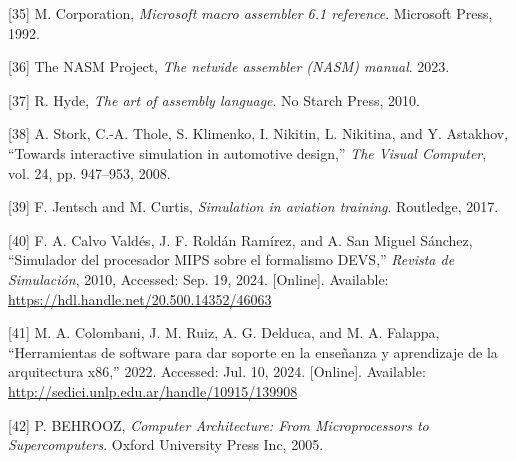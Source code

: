 \documentclass[12pt,oneside]{templates/unerthesis}
\newcommand{\CSLLeftMargin}[1]{#1} %
\newcommand{\CSLRightInline}[1]{#1} %
\newlength{\cslhangindent}
\newenvironment{CSLReferences}[2] %
 {\setlength{\parindent}{0pt}%
  \setlength{\leftskip}{#1 pt\relax}%
  \setlength{\parskip}{#2 pt\relax}%
  \everypar{\setlength{\hangindent}{\cslhangindent}}}
 {\par}
\begin{document}
\begin{CSLReferences}{0}{0}
\leavevmode{}%
\CSLLeftMargin{{[}35{]} }%
\CSLRightInline{M. Corporation, \emph{Microsoft macro assembler 6.1 reference}. Microsoft Press, 1992.}

\leavevmode{}%
\CSLLeftMargin{{[}36{]} }%
\CSLRightInline{The NASM Project, \emph{The netwide assembler (NASM) manual}. 2023.}

\leavevmode{}%
\CSLLeftMargin{{[}37{]} }%
\CSLRightInline{R. Hyde, \emph{The art of assembly language}. No Starch Press, 2010.}

\leavevmode{}%
\CSLLeftMargin{{[}38{]} }%
\CSLRightInline{A. Stork, C.-A. Thole, S. Klimenko, I. Nikitin, L. Nikitina, and Y. Astakhov, {``Towards interactive simulation in automotive design,''} \emph{The Visual Computer}, vol. 24, pp. 947--953, 2008.}

\leavevmode{}%
\CSLLeftMargin{{[}39{]} }%
\CSLRightInline{F. Jentsch and M. Curtis, \emph{Simulation in aviation training}. Routledge, 2017.}

\leavevmode{}%
\CSLLeftMargin{{[}40{]} }%
\CSLRightInline{F. A. Calvo Valdés, J. F. Roldán Ramírez, and A. San Miguel Sánchez, {``Simulador del procesador {MIPS} sobre el formalismo {DEVS},''} \emph{Revista de Simulación}, 2010, Accessed: Sep. 19, 2024. {[}Online{]}. Available: \url{https://hdl.handle.net/20.500.14352/46063}}

\leavevmode{}%
\CSLLeftMargin{{[}41{]} }%
\CSLRightInline{M. A. Colombani, J. M. Ruiz, A. G. Delduca, and M. A. Falappa, {``Herramientas de software para dar soporte en la enseñanza y aprendizaje de la arquitectura x86,''} 2022. Accessed: Jul. 10, 2024. {[}Online{]}. Available: \url{http://sedici.unlp.edu.ar/handle/10915/139908}}

\leavevmode{}%
\CSLLeftMargin{{[}42{]} }%
\CSLRightInline{P. BEHROOZ, \emph{Computer {Architecture}: {From} {Microprocessors} to {Supercomputers}}. Oxford University Press Inc, 2005.}

\end{CSLReferences}

%


\end{document}
